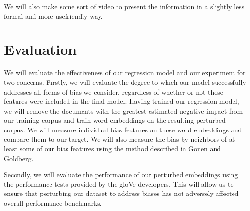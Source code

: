 \documentclass{article}
\begin{document}
We will also make some sort of video to present the information in a
slightly less formal and more usefriendly way.

\section{Evaluation}

We will evaluate the effectiveness of our regression model and our
experiment for two concerns. Firstly, we will evaluate the degree to
which our model successfully addresses all forms of bias we consider,
regardless of whether or not those features were included in the final
model. Having trained our regression model, we will remove the documents
with the greatest estimated negative impact from our training
corpus and train word embeddings on the resulting perturbed corpus. We
will measure individual bias features on those word embeddings and
compare them to our target. We will also measure the bias-by-neighbors
of at least some of our bias features using the method described in
Gonen and Goldberg\cite{gonen_lipstick_2019}.

Secondly, we will evaluate the performance of our perturbed embeddings
using the performance tests provided by the gloVe developers. This will
allow us to ensure that perturbing our dataset to address biases has not
adversely affected overall performance benchmarks.
\end{document}
